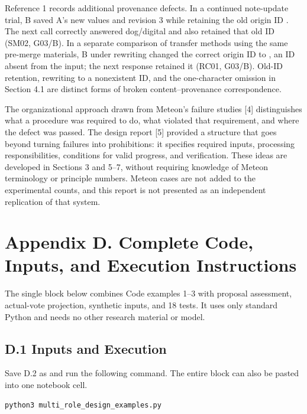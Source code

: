 \documentclass[10pt,a4paper]{article}
\begin{document}
Reference 1 records additional provenance defects. In a continued note-update trial, B saved A's new values and revision 3 while retaining the old origin ID \texttt{}. The next call correctly answered dog/digital and also retained that old ID (SM02, G03/B). In a separate comparison of transfer methods using the same pre-merge materials, B under rewriting changed the correct origin ID \texttt{} to \texttt{}, an ID absent from the input; the next response retained it (RC01, G03/B). Old-ID retention, rewriting to a nonexistent ID, and the one-character omission in Section 4.1 are distinct forms of broken content--provenance correspondence.

The organizational approach drawn from Meteon's failure studies {[}4{]} distinguishes what a procedure was required to do, what violated that requirement, and where the defect was passed. The design report {[}5{]} provided a structure that goes beyond turning failures into prohibitions: it specifies required inputs, processing responsibilities, conditions for valid progress, and verification. These ideas are developed in Sections 3 and 5--7, without requiring knowledge of Meteon terminology or principle numbers. Meteon cases are not added to the experimental counts, and this report is not presented as an independent replication of that system.

\section{Appendix D. Complete Code, Inputs, and Execution Instructions}\label{two-role-failure-design-appendix-d.-complete-code-inputs-and-execution-instructions}

The single block below combines Code examples 1--3 with proposal assessment, actual-vote projection, synthetic inputs, and 18 tests. It uses only standard Python and needs no other research material or model.

\subsection{D.1 Inputs and Execution}\label{two-role-failure-design-d.1-inputs-and-execution}

Save D.2 as \texttt{} and run the following command. The entire block can also be pasted into one notebook cell.

\noindent\begin{minipage}{\linewidth}
\begin{verbatim}
python3 multi_role_design_examples.py
\end{verbatim}
\end{minipage}\par
\end{document}
